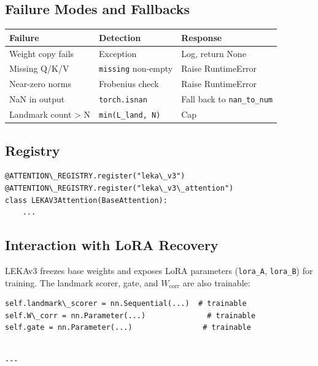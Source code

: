 \subsection{Failure Modes and Fallbacks}

\begin{table}[H]
\centering
\small
\begin{tabular}{lll}
\toprule
\textbf{Failure} & \textbf{Detection} & \textbf{Response} \\
\midrule
Weight copy fails & Exception & Log, return None \\
Missing Q/K/V & \texttt{missing} non-empty & Raise RuntimeError \\
Near-zero norms & Frobenius check & Raise RuntimeError \\
NaN in output & \texttt{torch.isnan} & Fall back to \texttt{nan\_to\_num} \\
Landmark count \textgreater{} N & \texttt{min(L\_land, N)} & Cap \\
\bottomrule
\end{tabular}
\end{table}

\subsection{Registry}

\begin{lstlisting}
@ATTENTION\_REGISTRY.register("leka\_v3")
@ATTENTION\_REGISTRY.register("leka\_v3\_attention")
class LEKAV3Attention(BaseAttention):
    ...
\end{lstlisting}

\subsection{Interaction with LoRA Recovery}

LEKAv3 freezes base weights and exposes LoRA parameters (\texttt{lora\_A}, \texttt{lora\_B}) 
for training. The landmark scorer, gate, and $W_\text{corr}$ are also 
trainable:

\begin{lstlisting}
self.landmark\_scorer = nn.Sequential(...)  # trainable
self.W\_corr = nn.Parameter(...)              # trainable
self.gate = nn.Parameter(...)                # trainable
\end{lstlisting}
\begin{lstlisting}

---
\end{lstlisting}

